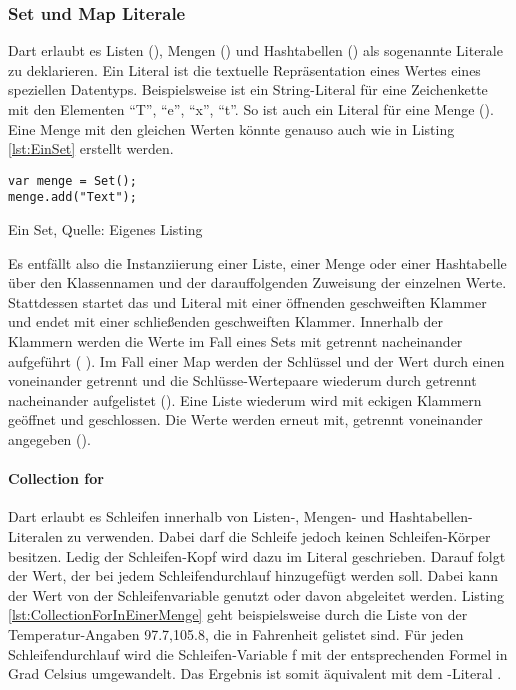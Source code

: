 \subsubsection{Set und Map Literale}

Dart erlaubt es Listen (), Mengen () und Hashtabellen () als sogenannte Literale zu deklarieren. Ein Literal ist die textuelle Repräsentation eines Wertes eines speziellen Datentyps. Beispielsweise ist   ein String-Literal für eine Zeichenkette mit den Elementen \enquote{T}, \enquote{e}, \enquote{x}, \enquote{t}. So ist auch   ein Literal für eine Menge (). Eine Menge mit den gleichen Werten könnte genauso auch wie in Listing \ref{lst:EinSet} erstellt werden.

\ifincludeall
    \begin{listing}[ht]
        \begin{verbatim}
var menge = Set();
menge.add("Text");
\end{verbatim}
        \caption[Ein Set]{Ein Set, Quelle: Eigenes Listing}
        \label{lst:EinSet}
    \end{listing}
\fi

Es entfällt also die Instanziierung einer Liste, einer Menge oder einer Hashtabelle über den Klassennamen und der darauffolgenden Zuweisung der einzelnen Werte. Stattdessen startet das  und  Literal mit einer öffnenden geschweiften Klammer und endet mit einer schließenden geschweiften Klammer. Innerhalb der Klammern werden die Werte im Fall eines Sets mit \IC{,} getrennt nacheinander aufgeführt (  ). Im Fall einer Map werden der Schlüssel und der Wert durch einen \IC{:} voneinander getrennt und die Schlüsse-Wertepaare wiederum durch \IC{,} getrennt nacheinander aufgelistet (). Eine Liste wiederum wird mit eckigen Klammern geöffnet und geschlossen. Die Werte werden erneut mit, getrennt voneinander angegeben (\IC{[1,2]}).

\paragraph{Collection for} Dart erlaubt es Schleifen innerhalb von Listen-, Mengen- und Hashtabellen-Literalen zu verwenden. Dabei darf die Schleife jedoch keinen Schleifen-Körper besitzen. Ledig der Schleifen-Kopf wird dazu im Literal geschrieben. Darauf folgt der Wert, der bei jedem Schleifendurchlauf hinzugefügt werden soll. Dabei kann der Wert von der Schleifenvariable genutzt oder davon abgeleitet werden.
Listing \ref{lst:CollectionForInEinerMenge} geht beispielsweise durch die Liste von der Temperatur-Angaben 97.7,105.8, die in Fahrenheit gelistet sind. Für jeden Schleifendurchlauf wird die Schleifen-Variable f mit der entsprechenden Formel in Grad Celsius umgewandelt. Das Ergebnis ist somit äquivalent mit dem -Literal .


